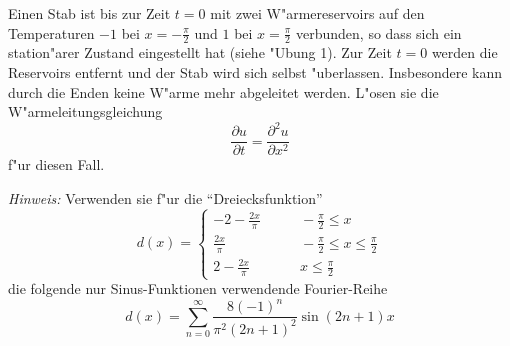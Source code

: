 Einen Stab ist bis zur Zeit $t=0$ mit zwei
W"armereservoirs auf den Temperaturen $-1$ bei $x=-\frac{\pi}2$ und
$1$ bei $x=\frac{\pi}2$ verbunden,
so dass sich ein station"arer Zustand eingestellt hat (siehe
"Ubung 1). Zur Zeit $t=0$ werden die Reservoirs entfernt und der
Stab wird sich selbst "uberlassen. Insbesondere kann durch die
Enden keine W"arme mehr abgeleitet werden. L"osen sie die
W"armeleitungsgleichung
\[
\frac{\partial u}{\partial t}=\frac{\partial^2 u}{\partial x^2}
\]
f"ur diesen Fall.

{\it Hinweis:} Verwenden sie f"ur die
``Dreiecksfunktion''
\[
d(x)
=
\begin{cases}
\displaystyle-2-\frac{2x}{\pi}&\qquad \displaystyle-\frac{\pi}2\le x\\
\displaystyle\frac{2x}{\pi}&\qquad \displaystyle-\frac{\pi}2\le x\le \frac{\pi}2\\
\displaystyle2-\frac{2x}{\pi}&\qquad \displaystyle x\le\frac{\pi}2
\end{cases}
\]
die folgende nur Sinus-Funktionen
verwendende Fourier-Reihe
\[
d(x)=\sum_{n=0}^\infty \frac{8(-1)^n}{\pi^2(2n+1)^2}\sin (2n+1)x
\]

